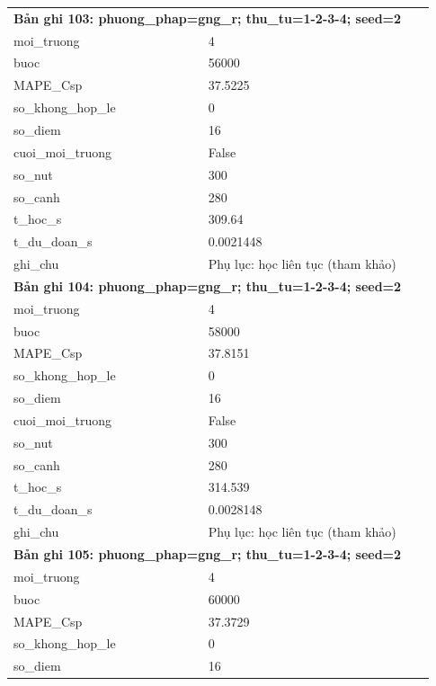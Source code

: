 \begin{longtable}{p{0.43\linewidth}p{0.50\linewidth}}
\midrule
\multicolumn{2}{p{0.95\linewidth}}{\textbf{Bản ghi 103: phuong\_phap=gng\_r; thu\_tu=1-2-3-4; seed=2}} \\
moi\_\allowbreak truong & 4 \\
buoc & 56000 \\
MAPE\_\allowbreak Csp & 37.5225 \\
so\_\allowbreak khong\_\allowbreak hop\_\allowbreak le & 0 \\
so\_\allowbreak diem & 16 \\
cuoi\_\allowbreak moi\_\allowbreak truong & False \\
so\_\allowbreak nut & 300 \\
so\_\allowbreak canh & 280 \\
t\_\allowbreak hoc\_\allowbreak s & 309.64 \\
t\_\allowbreak du\_\allowbreak doan\_\allowbreak s & 0.0021448 \\
ghi\_\allowbreak chu & Phụ lục: học liên tục (tham khảo) \\
\midrule
\multicolumn{2}{p{0.95\linewidth}}{\textbf{Bản ghi 104: phuong\_phap=gng\_r; thu\_tu=1-2-3-4; seed=2}} \\
moi\_\allowbreak truong & 4 \\
buoc & 58000 \\
MAPE\_\allowbreak Csp & 37.8151 \\
so\_\allowbreak khong\_\allowbreak hop\_\allowbreak le & 0 \\
so\_\allowbreak diem & 16 \\
cuoi\_\allowbreak moi\_\allowbreak truong & False \\
so\_\allowbreak nut & 300 \\
so\_\allowbreak canh & 280 \\
t\_\allowbreak hoc\_\allowbreak s & 314.539 \\
t\_\allowbreak du\_\allowbreak doan\_\allowbreak s & 0.0028148 \\
ghi\_\allowbreak chu & Phụ lục: học liên tục (tham khảo) \\
\midrule
\multicolumn{2}{p{0.95\linewidth}}{\textbf{Bản ghi 105: phuong\_phap=gng\_r; thu\_tu=1-2-3-4; seed=2}} \\
moi\_\allowbreak truong & 4 \\
buoc & 60000 \\
MAPE\_\allowbreak Csp & 37.3729 \\
so\_\allowbreak khong\_\allowbreak hop\_\allowbreak le & 0 \\
so\_\allowbreak diem & 16 \\

\end{longtable}
